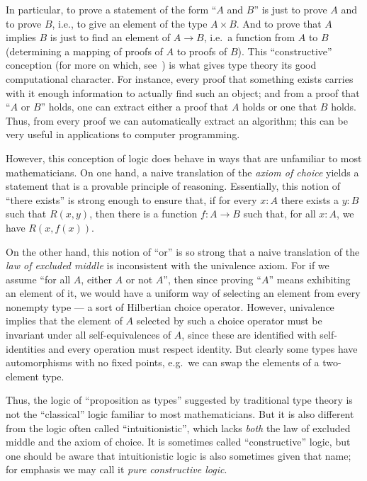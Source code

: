 In particular, to prove a statement of the form ``$A$ and $B$'' is just to prove $A$ and to prove $B$, i.e., to give an element of the type $A\times B$.
And to prove that $A$ implies $B$ is just to find an element of $A\to B$, i.e.\ a function from $A$ to $B$ (determining a mapping of proofs of $A$ to proofs of $B$).
This ``constructive'' conception (for more on which, see~\cite{kolmogorov,BHK}) is what gives type theory its good computational character.
For instance, every proof that something exists carries with it enough information to actually find such an object; and from a proof that  ``$A$ or $B$'' holds, one can extract either a proof that $A$ holds or one that $B$ holds.
Thus, from every proof we can automatically extract an algorithm; this can be very useful in applications to computer programming.

However, this conception of logic does behave in ways that are unfamiliar to most mathematicians.
On one hand, a naive translation of the \emph{axiom of choice} yields a statement that is a provable principle of reasoning.
Essentially, this notion of ``there exists'' is strong enough to ensure that, if for every $x: A$ there exists a $y:B$ such that $R(x,y)$, then there is a function $f : A\to B$ such that, for all $x:A$, we have $R(x, f(x))$.

On the other hand, this notion of ``or'' is so strong that a naive translation of the \emph{law of excluded middle} is inconsistent with the univalence axiom.
For if we assume ``for all $A$, either $A$ or not $A$'', then since proving ``$A$'' means exhibiting an element of it, we would have a uniform way of selecting an element from every nonempty type --- a sort of Hilbertian choice operator.
However, univalence implies that the element of $A$ selected by such a choice operator must be invariant under all self-equivalences of $A$, since these are identified with self-identities and every operation must respect identity.
But clearly some types have automorphisms with no fixed points, e.g.\ we can swap the elements of a two-element type.

Thus, the logic of ``proposition as types'' suggested by traditional type theory is not the ``classical'' logic familiar to most mathematicians.
But it is also different from the logic often called ``intuitionistic'', which lacks \emph{both} the law of excluded middle and the axiom of choice.
It is sometimes called ``constructive'' logic, but one should be aware that intuitionistic logic is also sometimes given that name; for emphasis we may call it \emph{pure constructive logic}.

